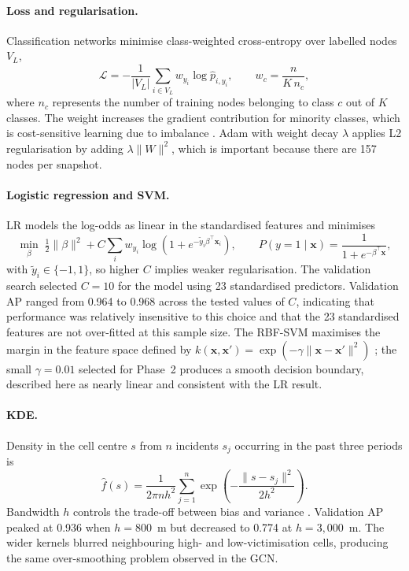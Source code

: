 \documentclass[11pt,a4paper]{report}
\begin{document}
\paragraph{Loss and regularisation.} Classification networks minimise class-weighted cross-entropy over labelled nodes $V_L$,
\begin{equation}
\mathcal{L}=-\frac{1}{|V_L|}\sum_{i\in V_L}w_{y_i}\log\hat{p}_{i,y_i},\qquad w_c=\frac{n}{K\,n_c},
\label{eq:loss}
\end{equation}
where $n_c$ represents the number of training nodes belonging to class $c$ out of $K$ classes. The weight increases the gradient contribution for minority classes, which is cost-sensitive learning due to imbalance \citep{he2009}. Adam with weight decay $\lambda$ applies L2 regularisation by adding $\lambda\lVert W\rVert^2$, which is important because there are 157 nodes per snapshot.

\paragraph{Logistic regression and SVM.} LR models the log-odds as linear in the standardised features and minimises
\begin{equation}
\min_{\beta}\;\tfrac{1}{2}\lVert\beta\rVert^2+C\sum_i w_{y_i}\log\!\left(1+e^{-\tilde{y}_i\beta^\top\mathbf{x}_i}\right),\qquad P(y=1\mid\mathbf{x})=\frac{1}{1+e^{-\beta^\top\mathbf{x}}},
\label{eq:lr}
\end{equation}
with \(\tilde{y}_i\in\{-1,1\}\), so higher \(C\) implies weaker regularisation. The validation search selected \(C=10\) for the model using 23 standardised predictors. Validation AP ranged from 0.964 to 0.968 across the tested values of \(C\), indicating that performance was relatively insensitive to this choice and that the 23 standardised features are not over-fitted at this sample size. The RBF-SVM maximises the margin in the feature space defined by \(k(\mathbf{x},\mathbf{x}')=\exp(-\gamma\lVert\mathbf{x}-\mathbf{x}'\rVert^2)\) \citep{cortes1995}; the small \(\gamma=0.01\) selected for Phase~2 produces a smooth decision boundary, described here as nearly linear and consistent with the LR result.



\paragraph{KDE.} Density in the cell centre $s$ from $n$ incidents $s_j$ occurring in the past three periods is
\begin{equation}
\hat{f}(s)=\frac{1}{2\pi n h^{2}}\sum_{j=1}^{n}\exp\!\left(-\frac{\lVert s-s_j\rVert^{2}}{2h^{2}}\right).
\label{eq:kde}
\end{equation}
Bandwidth $h$ controls the trade-off between bias and variance \citep{silverman1986}. Validation AP peaked at 0.936 when $h=800$~m  but decreased to 0.774 at $h=3,000$~m. The wider kernels blurred neighbouring high- and low-victimisation cells, producing the same over-smoothing problem observed in the GCN.
\end{document}
